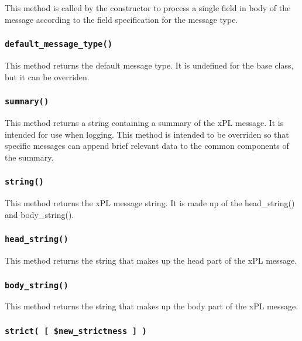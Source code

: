 \documentclass[12pt,a4paper]{article}
\begin{document}
This method is called by the constructor to process a single field
in body of the message according to the field specification for the
message type.

\subsubsection*{\texttt{default\_message\_type()}\label{xPL::Message_default_message_type_}}


This method returns the default message type.  It is undefined for
the base class, but it can be overriden.

\subsubsection*{\texttt{summary()}\label{xPL::Message_summary_}}


This method returns a string containing a summary of the xPL message.
It is intended for use when logging.  This method is intended to be
overriden so that specific messages can append brief relevant data
to the common components of the summary.

\subsubsection*{\texttt{string()}\label{xPL::Message_string_}}


This method returns the xPL message string.  It is made up of the
\textsf{head\_string()} and \textsf{body\_string()}.

\subsubsection*{\texttt{head\_string()}\label{xPL::Message_head_string_}}


This method returns the string that makes up the head part of the xPL
message.

\subsubsection*{\texttt{body\_string()}\label{xPL::Message_body_string_}}


This method returns the string that makes up the body part of the xPL
message.

\subsubsection*{\texttt{strict( [ \$new\_strictness ] )}\label{xPL::Message_strict_new_strictness_}}
\end{document}
